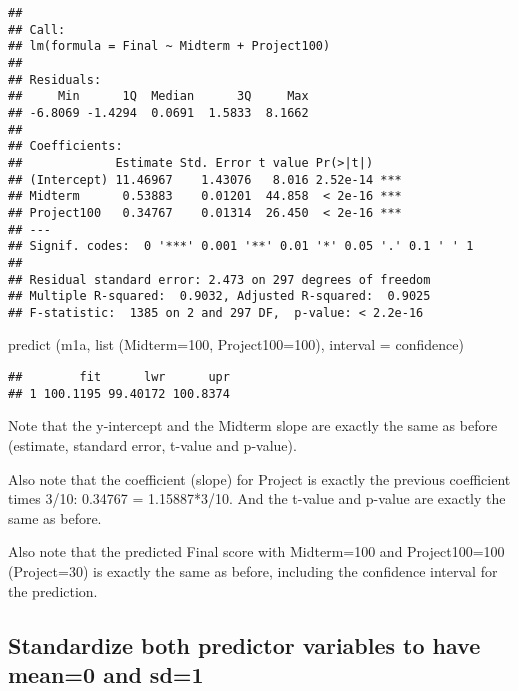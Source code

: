 \documentclass[
]{article}
\newenvironment{Shaded}{\begin{snugshade}}{\end{snugshade}}
\newcommand{\AttributeTok}[1]{\textcolor[rgb]{0.77,0.63,0.00}{#1}}
\newcommand{\DecValTok}[1]{\textcolor[rgb]{0.00,0.00,0.81}{#1}}
\newcommand{\FunctionTok}[1]{\textcolor[rgb]{0.00,0.00,0.00}{#1}}
\newcommand{\NormalTok}[1]{#1}
\newcommand{\StringTok}[1]{\textcolor[rgb]{0.31,0.60,0.02}{#1}}
\begin{document}
\begin{verbatim}
## 
## Call:
## lm(formula = Final ~ Midterm + Project100)
## 
## Residuals:
##     Min      1Q  Median      3Q     Max 
## -6.8069 -1.4294  0.0691  1.5833  8.1662 
## 
## Coefficients:
##             Estimate Std. Error t value Pr(>|t|)    
## (Intercept) 11.46967    1.43076   8.016 2.52e-14 ***
## Midterm      0.53883    0.01201  44.858  < 2e-16 ***
## Project100   0.34767    0.01314  26.450  < 2e-16 ***
## ---
## Signif. codes:  0 '***' 0.001 '**' 0.01 '*' 0.05 '.' 0.1 ' ' 1
## 
## Residual standard error: 2.473 on 297 degrees of freedom
## Multiple R-squared:  0.9032, Adjusted R-squared:  0.9025 
## F-statistic:  1385 on 2 and 297 DF,  p-value: < 2.2e-16
\end{verbatim}

\begin{Shaded}
\begin{Highlighting}[]
\FunctionTok{predict}\NormalTok{ (m1a, }\FunctionTok{list}\NormalTok{ (}\AttributeTok{Midterm=}\DecValTok{100}\NormalTok{, }\AttributeTok{Project100=}\DecValTok{100}\NormalTok{), }\AttributeTok{interval =} \StringTok{\textquotesingle{}confidence\textquotesingle{}}\NormalTok{)}
\end{Highlighting}
\end{Shaded}

\begin{verbatim}
##        fit      lwr      upr
## 1 100.1195 99.40172 100.8374
\end{verbatim}

Note that the y-intercept and the Midterm slope are exactly the same as
before (estimate, standard error, t-value and p-value).

Also note that the coefficient (slope) for Project is exactly the
previous coefficient times 3/10: 0.34767 = 1.15887*3/10. And the t-value
and p-value are exactly the same as before.

Also note that the predicted Final score with Midterm=100 and
Project100=100 (Project=30) is exactly the same as before, including the
confidence interval for the prediction.

\hypertarget{standardize-both-predictor-variables-to-have-mean0-and-sd1}{%
\subsection{Standardize both predictor variables to have mean=0 and
sd=1}\label{standardize-both-predictor-variables-to-have-mean0-and-sd1}}
\end{document}
